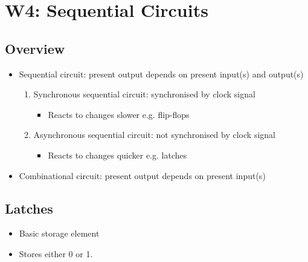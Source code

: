 \documentclass[a4paper]{article}
\begin{document}
\newpage
\section{W4: Sequential Circuits}

\subsection{Overview}
\begin{itemize}
    \item Sequential circuit: present output depends on present input(s) and output(s)
    \begin{enumerate}
        \item Synchronous sequential circuit: synchronised by clock signal
        \begin{itemize}[label=$\circ$]
            \item Reacts to changes slower \quad e.g. flip-flops
        \end{itemize}
        \item Asynchronous sequential circuit: not synchronised by clock signal
        \begin{itemize}[label=$\circ$]
            \item Reacts to changes quicker \quad e.g. latches
        \end{itemize}
    \end{enumerate}
    \item Combinational circuit: present output depends on present input(s)
\end{itemize}

\subsection{Latches}
\begin{itemize}
    \item Basic storage element
    \item Stores either 0 or 1.
\end{itemize}
\end{document}
